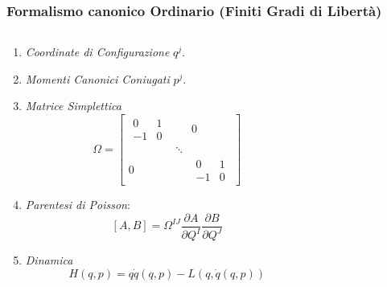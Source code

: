 \documentclass[8pt,handout]{beamer}
\begin{document}
	\begin{frame}	%
		\frametitle{Formalismo canonico Ordinario (Finiti Gradi di Libertà)}
  			\begin{columns}[T]
    			\begin{column}{.5\textwidth}
						\begin{enumerate}
							\item\emph{Coordinate di Configurazione} $q^j$.
							\item\emph{Momenti Canonici Coniugati}  $p^j$.
							\item \emph{Matrice Simplettica} 
								\begin{displaymath}
									\Omega=\begin{bmatrix}
										\begin{matrix}0 & 1\\ -1 & 0\end{matrix} & & 0 \\
											 & \ddots & \\
											 0 & & \begin{matrix}0 & 1 \\ -1 & 0
										\end{matrix}
									\end{bmatrix}
								\end{displaymath}
							\item \emph{Parentesi di Poisson}: 
								\begin{displaymath}
									\left[ A , B \right] = \Omega^{I J} \frac{\partial A}{\partial Q^I} \frac{\partial B}{\partial Q^J}					
								\end{displaymath}
							\item \emph{Dinamica}
								\begin{displaymath}
									H(q,p) =  q \dot{q}(q,p)-L\left(q, \dot{q}(q,p)\right)
								\end{displaymath}
								
								
						\end{enumerate}
    			\end{column}
    		   	\begin{column}{.5\textwidth}
					\parbox[c][.7\textheight][c]{\columnwidth}{%
 
  					}	
    			\end{column}
  			\end{columns}	
		\end{frame}
\end{document}
